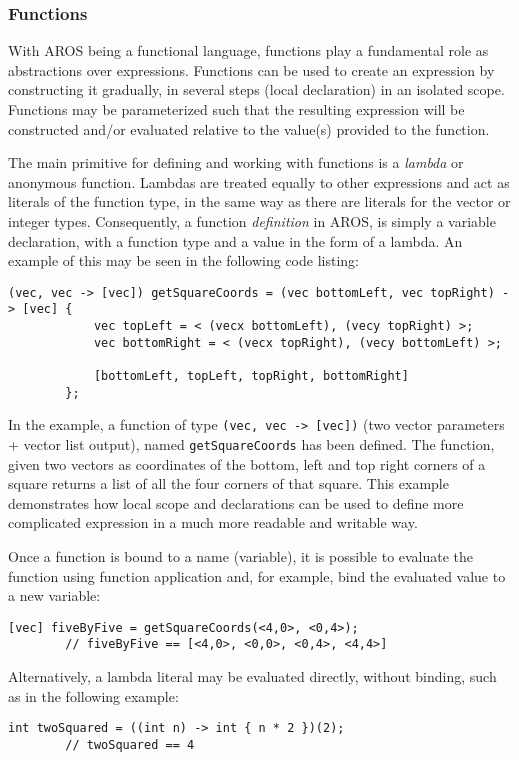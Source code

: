 \subsubsection{Functions}
With AROS being a functional language, functions play a fundamental role as abstractions over expressions. Functions can be used to create an expression by constructing it gradually, in several steps (local declaration) in an isolated scope. Functions may be parameterized such that the resulting expression will be constructed and/or evaluated relative to the value(s) provided to the function.

\par{} The main primitive for defining and working with functions is a \textit{lambda} or anonymous function. Lambdas are treated equally to other expressions and act as literals of the function type, in the same way as there are literals for the vector or integer types. Consequently, a function \textit{definition} in AROS, is simply a variable declaration, with a function type and a value in the form of a lambda. An example of this may be seen in the following code listing:
    \begin{lstlisting}[language=aros, float=htb, caption= Function definition by binding a lambda literal to a name]
        (vec, vec -> [vec]) getSquareCoords = (vec bottomLeft, vec topRight) -> [vec] {
            vec topLeft = < (vecx bottomLeft), (vecy topRight) >;
            vec bottomRight = < (vecx topRight), (vecy bottomLeft) >;
            
            [bottomLeft, topLeft, topRight, bottomRight]
        };
    \end{lstlisting}
In the example, a function of type \lstinline{(vec, vec -> [vec])} (two vector parameters + vector list output), named \lstinline{getSquareCoords} has been defined. The function, given two vectors as coordinates of the bottom, left and top right corners of a square returns a list of all the four corners of that square. This example demonstrates how local scope and declarations can be used to define more complicated expression in a much more readable and writable way. 

\par{} Once a function is bound to a name (variable), it is possible to evaluate the function using function application and, for example, bind the evaluated value to a new variable:
    \begin{lstlisting}[language=aros, caption= Function application example]
        [vec] fiveByFive = getSquareCoords(<4,0>, <0,4>);
        // fiveByFive == [<4,0>, <0,0>, <0,4>, <4,4>]
    \end{lstlisting}
\par{} Alternatively, a lambda literal may be evaluated directly, without binding, such as in the following example:
    \begin{lstlisting}[language=aros,float=htb,caption= Direct application of a lambda literal]
        int twoSquared = ((int n) -> int { n * 2 })(2);
        // twoSquared == 4
    \end{lstlisting}

